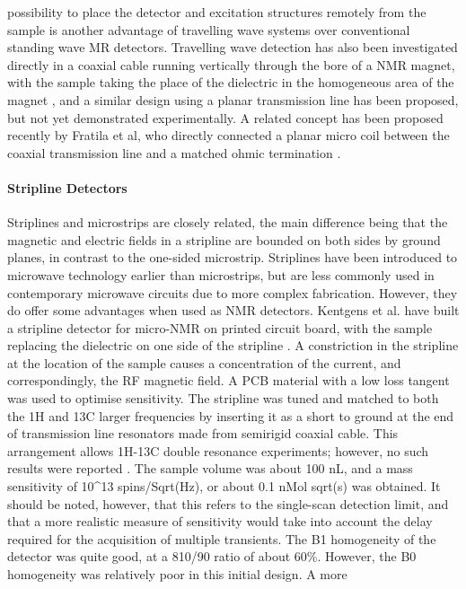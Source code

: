 possibility to place the detector and excitation structures remotely
from the sample is another advantage of travelling wave systems over
conventional standing wave MR detectors. Travelling wave detection has
also been investigated directly in a coaxial cable running vertically
through the bore of a NMR magnet, with the sample taking the place of
the dielectric in the homogeneous area of the magnet \cite{Tang:2011ev},
and a similar design using a planar transmission line has been proposed,
but not yet demonstrated experimentally. A related concept has been
proposed recently by Fratila et al, who directly connected a planar
micro coil between the coaxial transmission line and a matched ohmic
termination \cite{Fratila:2014bv}.

\paragraph{Stripline Detectors}
 Striplines
and microstrips are closely related, the main difference being that the
magnetic and electric fields in a stripline are bounded on both sides by
ground planes, in contrast to the one-sided microstrip. Striplines have
been introduced to microwave technology earlier than microstrips, but
are less commonly used in contemporary microwave circuits due to more
complex fabrication. However, they do offer some advantages when used as
NMR detectors. Kentgens et al. have built a stripline detector for
micro-NMR on printed circuit board, with the sample replacing the
dielectric on one side of the stripline \cite{vanBentum:2007fd}. A
constriction in the stripline at the location of the sample causes a
concentration of the current, and correspondingly, the RF magnetic
field. A PCB material with a low loss tangent was used to optimise
sensitivity. The stripline was tuned and matched to both the 1H and 13C
larger frequencies by inserting it as a short to ground at the end of
transmission line resonators made from semirigid coaxial cable. This
arrangement allows 1H-13C double resonance experiments; however, no such
results were reported \cite{vanBentum:2007fd}. The sample volume was about
100 nL, and a mass sensitivity of 10\^{}13 spins/Sqrt(Hz), or about 0.1
nMol sqrt(s) was obtained. It should be noted, however, that this refers
to the single-scan detection limit, and that a more realistic measure of
sensitivity would take into account the delay required for the
acquisition of multiple transients. The B1 homogeneity of the detector
was quite good, at a 810/90 ratio of about 60\%. However, the B0
homogeneity was relatively poor in this initial design. A more
